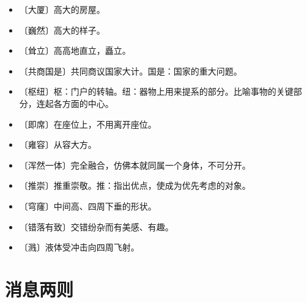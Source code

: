 \documentclass[12pt,UTF-8,openany]{ctexbook}
\begin{document}
\begin{itemize}
    \setlength\itemsep{-0.2em}
    \item 〔大厦〕高大的房屋。
    \item 〔巍然〕高大的样子。
    \item 〔耸立〕高高地直立，矗立。
    \item 〔共商国是〕共同商议国家大计。国是：国家的重大问题。
    \item 〔枢纽〕枢：门户的转轴。纽：器物上用来提系的部分。比喻事物的关键部分，连起各方面的中心。
    \item 〔即席〕在座位上，不用离开座位。
    \item 〔雍容〕从容大方。
    \item 〔浑然一体〕完全融合，仿佛本就同属一个身体，不可分开。
    \item 〔推崇〕推重崇敬。推：指出优点，使成为优先考虑的对象。
    \item 〔穹窿〕中间高、四周下垂的形状。
    \item 〔错落有致〕交错纷杂而有美感、有趣。
    \item 〔溅〕液体受冲击向四周飞射。
\end{itemize}

\chapter{消息两则}
\end{document}
